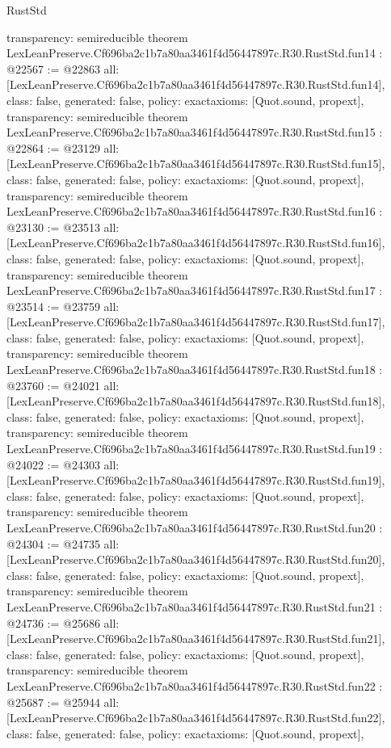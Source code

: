 \begin{lexlean}{RustStd}
\begin{coremodule}
{  transparency: semireducible
}
theorem LexLeanPreserve.Cf696ba2c1b7a80aa3461f4d56447897c.R30.RustStd.fun14 : @22567 := @22863 {
  all: [LexLeanPreserve.Cf696ba2c1b7a80aa3461f4d56447897c.R30.RustStd.fun14],
  class: false,
  generated: false,
  policy: exact{axioms: [Quot.sound, propext]},
  transparency: semireducible
}
theorem LexLeanPreserve.Cf696ba2c1b7a80aa3461f4d56447897c.R30.RustStd.fun15 : @22864 := @23129 {
  all: [LexLeanPreserve.Cf696ba2c1b7a80aa3461f4d56447897c.R30.RustStd.fun15],
  class: false,
  generated: false,
  policy: exact{axioms: [Quot.sound, propext]},
  transparency: semireducible
}
theorem LexLeanPreserve.Cf696ba2c1b7a80aa3461f4d56447897c.R30.RustStd.fun16 : @23130 := @23513 {
  all: [LexLeanPreserve.Cf696ba2c1b7a80aa3461f4d56447897c.R30.RustStd.fun16],
  class: false,
  generated: false,
  policy: exact{axioms: [Quot.sound, propext]},
  transparency: semireducible
}
theorem LexLeanPreserve.Cf696ba2c1b7a80aa3461f4d56447897c.R30.RustStd.fun17 : @23514 := @23759 {
  all: [LexLeanPreserve.Cf696ba2c1b7a80aa3461f4d56447897c.R30.RustStd.fun17],
  class: false,
  generated: false,
  policy: exact{axioms: [Quot.sound, propext]},
  transparency: semireducible
}
theorem LexLeanPreserve.Cf696ba2c1b7a80aa3461f4d56447897c.R30.RustStd.fun18 : @23760 := @24021 {
  all: [LexLeanPreserve.Cf696ba2c1b7a80aa3461f4d56447897c.R30.RustStd.fun18],
  class: false,
  generated: false,
  policy: exact{axioms: [Quot.sound, propext]},
  transparency: semireducible
}
theorem LexLeanPreserve.Cf696ba2c1b7a80aa3461f4d56447897c.R30.RustStd.fun19 : @24022 := @24303 {
  all: [LexLeanPreserve.Cf696ba2c1b7a80aa3461f4d56447897c.R30.RustStd.fun19],
  class: false,
  generated: false,
  policy: exact{axioms: [Quot.sound, propext]},
  transparency: semireducible
}
theorem LexLeanPreserve.Cf696ba2c1b7a80aa3461f4d56447897c.R30.RustStd.fun20 : @24304 := @24735 {
  all: [LexLeanPreserve.Cf696ba2c1b7a80aa3461f4d56447897c.R30.RustStd.fun20],
  class: false,
  generated: false,
  policy: exact{axioms: [Quot.sound, propext]},
  transparency: semireducible
}
theorem LexLeanPreserve.Cf696ba2c1b7a80aa3461f4d56447897c.R30.RustStd.fun21 : @24736 := @25686 {
  all: [LexLeanPreserve.Cf696ba2c1b7a80aa3461f4d56447897c.R30.RustStd.fun21],
  class: false,
  generated: false,
  policy: exact{axioms: [Quot.sound, propext]},
  transparency: semireducible
}
theorem LexLeanPreserve.Cf696ba2c1b7a80aa3461f4d56447897c.R30.RustStd.fun22 : @25687 := @25944 {
  all: [LexLeanPreserve.Cf696ba2c1b7a80aa3461f4d56447897c.R30.RustStd.fun22],
  class: false,
  generated: false,
  policy: exact{axioms: [Quot.sound, propext]},
}
\end{coremodule}
\end{lexlean}
